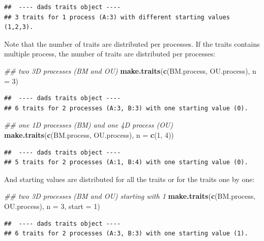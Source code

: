 \documentclass[]{book}
\newenvironment{Shaded}{\begin{snugshade}}{\end{snugshade}}
\newcommand{\CommentTok}[1]{\textcolor[rgb]{0.56,0.35,0.01}{\textit{#1}}}
\newcommand{\DataTypeTok}[1]{\textcolor[rgb]{0.13,0.29,0.53}{#1}}
\newcommand{\DecValTok}[1]{\textcolor[rgb]{0.00,0.00,0.81}{#1}}
\newcommand{\KeywordTok}[1]{\textcolor[rgb]{0.13,0.29,0.53}{\textbf{#1}}}
\newcommand{\NormalTok}[1]{#1}
\begin{document}
\begin{verbatim}
##  ---- dads traits object ---- 
## 3 traits for 1 process (A:3) with different starting values (1,2,3).
\end{verbatim}

Note that the number of traits are distributed per processes.
If the traits contains multiple process, the number of traits are distributed per processes:

\begin{Shaded}
\begin{Highlighting}[]
\CommentTok{## two 3D processes (BM and OU)}
\KeywordTok{make.traits}\NormalTok{(}\KeywordTok{c}\NormalTok{(BM.process, OU.process), }\DataTypeTok{n =} \DecValTok{3}\NormalTok{)}
\end{Highlighting}
\end{Shaded}

\begin{verbatim}
##  ---- dads traits object ---- 
## 6 traits for 2 processes (A:3, B:3) with one starting value (0).
\end{verbatim}

\begin{Shaded}
\begin{Highlighting}[]
\CommentTok{## one 1D processes (BM) and one 4D process (OU)}
\KeywordTok{make.traits}\NormalTok{(}\KeywordTok{c}\NormalTok{(BM.process, OU.process), }\DataTypeTok{n =} \KeywordTok{c}\NormalTok{(}\DecValTok{1}\NormalTok{, }\DecValTok{4}\NormalTok{))}
\end{Highlighting}
\end{Shaded}

\begin{verbatim}
##  ---- dads traits object ---- 
## 5 traits for 2 processes (A:1, B:4) with one starting value (0).
\end{verbatim}

And starting values are distributed for all the traits or for the traits one by one:

\begin{Shaded}
\begin{Highlighting}[]
\CommentTok{## two 3D processes (BM and OU) starting with 1}
\KeywordTok{make.traits}\NormalTok{(}\KeywordTok{c}\NormalTok{(BM.process, OU.process), }\DataTypeTok{n =} \DecValTok{3}\NormalTok{, }\DataTypeTok{start =} \DecValTok{1}\NormalTok{)}
\end{Highlighting}
\end{Shaded}

\begin{verbatim}
##  ---- dads traits object ---- 
## 6 traits for 2 processes (A:3, B:3) with one starting value (1).
\end{verbatim}
\end{document}
